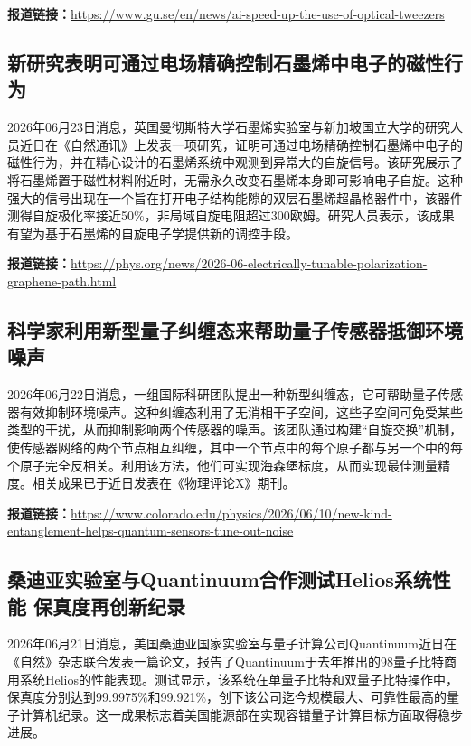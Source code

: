 \documentclass[12pt,a4paper]{ctexart}
\begin{document}
\noindent\textbf{报道链接：}\url{https://www.gu.se/en/news/ai-speed-up-the-use-of-optical-tweezers}

\subsection{ 新研究表明可通过电场精确控制石墨烯中电子的磁性行为 }

2026年06月23日消息，英国曼彻斯特大学石墨烯实验室与新加坡国立大学的研究人员近日在《自然通讯》上发表一项研究，证明可通过电场精确控制石墨烯中电子的磁性行为，并在精心设计的石墨烯系统中观测到异常大的自旋信号。该研究展示了将石墨烯置于磁性材料附近时，无需永久改变石墨烯本身即可影响电子自旋。这种强大的信号出现在一个旨在打开电子结构能隙的双层石墨烯超晶格器件中，该器件测得自旋极化率接近50\%，非局域自旋电阻超过300欧姆。研究人员表示，该成果有望为基于石墨烯的自旋电子学提供新的调控手段。

\noindent\textbf{报道链接：}\url{https://phys.org/news/2026-06-electrically-tunable-polarization-graphene-path.html}

\subsection{ 科学家利用新型量子纠缠态来帮助量子传感器抵御环境噪声 }

2026年06月22日消息，一组国际科研团队提出一种新型纠缠态，它可帮助量子传感器有效抑制环境噪声。这种纠缠态利用了无消相干子空间，这些子空间可免受某些类型的干扰，从而抑制影响两个传感器的噪声。该团队通过构建“自旋交换”机制，使传感器网络的两个节点相互纠缠，其中一个节点中的每个原子都与另一个中的每个原子完全反相关。利用该方法，他们可实现海森堡标度，从而实现最佳测量精度。相关成果已于近日发表在《物理评论X》期刊。

\noindent\textbf{报道链接：}\url{https://www.colorado.edu/physics/2026/06/10/new-kind-entanglement-helps-quantum-sensors-tune-out-noise}

\subsection{ 桑迪亚实验室与Quantinuum合作测试Helios系统性能 保真度再创新纪录 }

2026年06月21日消息，美国桑迪亚国家实验室与量子计算公司Quantinuum近日在《自然》杂志联合发表一篇论文，报告了Quantinuum于去年推出的98量子比特商用系统Helios的性能表现。测试显示，该系统在单量子比特和双量子比特操作中，保真度分别达到99.9975\%和99.921\%，创下该公司迄今规模最大、可靠性最高的量子计算机纪录。这一成果标志着美国能源部在实现容错量子计算目标方面取得稳步进展。
\end{document}
